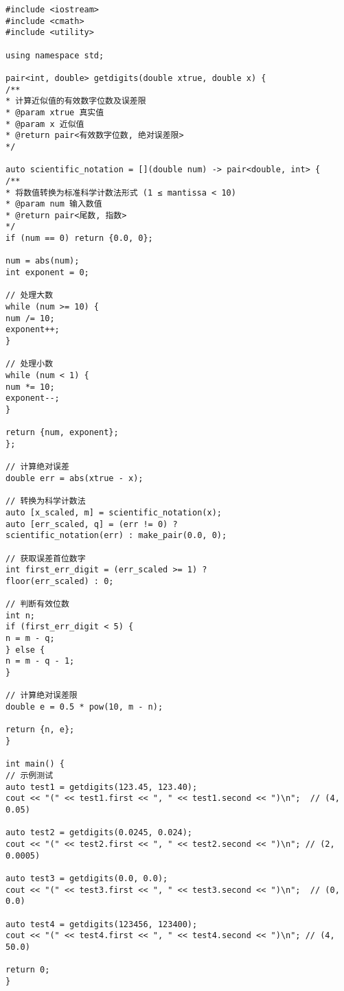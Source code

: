 \documentclass[UTF8]{ctexart}
\begin{document}
\begin{lstlisting}[style=cppstyle,caption={C++ 有效数字计算函数 (getdigits.cpp)},label=lst:getdigits-cpp]
#include <iostream>
#include <cmath>
#include <utility>

using namespace std;

pair<int, double> getdigits(double xtrue, double x) {
/**
* 计算近似值的有效数字位数及误差限
* @param xtrue 真实值
* @param x 近似值
* @return pair<有效数字位数, 绝对误差限>
*/

auto scientific_notation = [](double num) -> pair<double, int> {
/**
* 将数值转换为标准科学计数法形式 (1 ≤ mantissa < 10)
* @param num 输入数值
* @return pair<尾数, 指数>
*/
if (num == 0) return {0.0, 0};

num = abs(num);
int exponent = 0;

// 处理大数
while (num >= 10) {
num /= 10;
exponent++;
}

// 处理小数
while (num < 1) {
num *= 10;
exponent--;
}

return {num, exponent};
};

// 计算绝对误差
double err = abs(xtrue - x);

// 转换为科学计数法
auto [x_scaled, m] = scientific_notation(x);
auto [err_scaled, q] = (err != 0) ? 
scientific_notation(err) : make_pair(0.0, 0);

// 获取误差首位数字
int first_err_digit = (err_scaled >= 1) ? 
floor(err_scaled) : 0;

// 判断有效位数
int n;
if (first_err_digit < 5) {
n = m - q;
} else {
n = m - q - 1;
}

// 计算绝对误差限
double e = 0.5 * pow(10, m - n);

return {n, e};
}

int main() {
// 示例测试
auto test1 = getdigits(123.45, 123.40);
cout << "(" << test1.first << ", " << test1.second << ")\n";  // (4, 0.05)

auto test2 = getdigits(0.0245, 0.024);
cout << "(" << test2.first << ", " << test2.second << ")\n"; // (2, 0.0005)

auto test3 = getdigits(0.0, 0.0);
cout << "(" << test3.first << ", " << test3.second << ")\n";  // (0, 0.0)

auto test4 = getdigits(123456, 123400);
cout << "(" << test4.first << ", " << test4.second << ")\n"; // (4, 50.0)

return 0;
}
\end{lstlisting}
\end{document}

